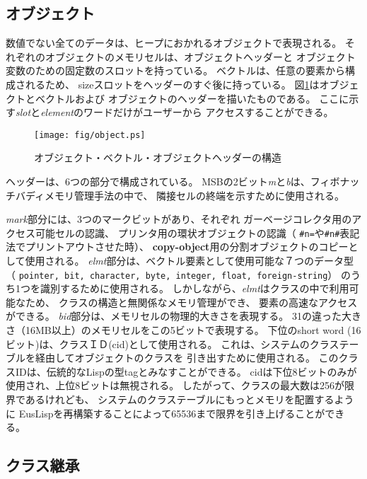 \subsection{オブジェクト}
数値でない全てのデータは、ヒープにおかれるオブジェクトで表現される。
それぞれのオブジェクトのメモリセルは、オブジェクトヘッダーと
オブジェクト変数のための固定数のスロットを持っている。
ベクトルは、任意の要素から構成されるため、
sizeスロットをヘッダーのすぐ後に持っている。
図\ref{ObjectFig}はオブジェクトとベクトルおよび
オブジェクトのヘッダーを描いたものである。
ここに示す{\em slot}と{\em element}のワードだけがユーザーから
アクセスすることができる。


\begin{figure}[hbt]
\begin{center}
\texttt{[image: fig/object.ps]}
\end{center}
\caption{\label{ObjectFig}オブジェクト・ベクトル・オブジェクトヘッダーの構造}
\end{figure}

ヘッダーは、6つの部分で構成されている。
MSBの2ビット{\em m}と{\em b}は、フィボナッチバディメモリ管理手法の中で、
隣接セルの終端を示すために使用される。

{\em mark}部分には、3つのマークビットがあり、それぞれ
ガーベージコレクタ用のアクセス可能セルの認識、
プリンタ用の環状オブジェクトの認識（
{\tt \#n=}や{\tt \#n\#}表記法でプリントアウトさせた時）、
{\bf copy-object}用の分割オブジェクトのコピーとして使用される。
{\em elmt}部分は、ベクトル要素として使用可能な７つのデータ型（
{\tt pointer, bit, character, byte, integer, float, foreign-string}）
のうち1つを識別するために使用される。
しかしながら、{\em elmt}はクラスの中で利用可能なため、
クラスの構造と無関係なメモリ管理ができ、
要素の高速なアクセスができる。
{\em bid}部分は、メモリセルの物理的大きさを表現する。
31の違った大きさ（16MB以上）のメモリセルをこの5ビットで表現する。
下位のshort word (16ビット)は、クラスＩＤ(cid)として使用される。
これは、システムのクラステーブルを経由してオブジェクトのクラスを
引き出すために使用される。
このクラスIDは、伝統的なLispの型tagとみなすことができる。
cidは下位8ビットのみが使用され、上位8ビットは無視される。
したがって、クラスの最大数は256が限界であるけれども、
システムのクラステーブルにもっとメモリを配置するように
EusLispを再構築することによって65536まで限界を引き上げることができる。

\subsection{クラス継承}

